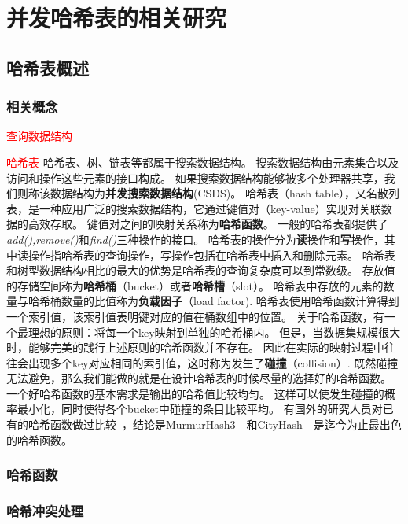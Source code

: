 \chapter{并发哈希表的相关研究}


\section{哈希表概述}

\subsection{相关概念}

\textcolor{red}{查询数据结构}

\textcolor{red}{哈希表}
哈希表、树、链表等都属于搜索数据结构。
搜索数据结构由元素集合以及访问和操作这些元素的接口构成。
如果搜索数据结构能够被多个处理器共享，我们则称该数据结构为\textbf{并发搜索数据结构}(CSDS)。
哈希表（hash table），又名散列表，是一种应用广泛的搜索数据结构，它通过键值对（key-value）实现对关联数据的高效存取。
键值对之间的映射关系称为\textbf{哈希函数}。
一般的哈希表都提供了\textit{add(),remove()}和\textit{find()}三种操作的接口。
哈希表的操作分为\textbf{读}操作和\textbf{写}操作，其中读操作指哈希表的查询操作，写操作包括在哈希表中插入和删除元素。
哈希表和树型数据结构相比的最大的优势是哈希表的查询复杂度可以到常数级。
存放值的存储空间称为\textbf{哈希桶}（bucket）或者\textbf{哈希槽}（slot）。
哈希表中存放的元素的数量与哈希桶数量的比值称为\textbf{负载因子}（load factor).
哈希表使用哈希函数计算得到一个索引值，该索引值表明键对应的值在桶数组中的位置。
关于哈希函数，有一个最理想的原则：将每一个key映射到单独的哈希桶内。
但是，当数据集规模很大时，能够完美的践行上述原则的哈希函数并不存在。
因此在实际的映射过程中往往会出现多个key对应相同的索引值，这时称为发生了\textbf{碰撞}（collision）.
既然碰撞无法避免，那么我们能做的就是在设计哈希表的时候尽量的选择好的哈希函数。
一个好哈希函数的基本需求是输出的哈希值比较均匀。
这样可以使发生碰撞的概率最小化，同时使得各个bucket中碰撞的条目比较平均。
有国外的研究人员对已有的哈希函数做过比较~\cite{Josh2012}，结论是MurmurHash3~\cite{Murmurhash}~和CityHash~\cite{cityhash}~是迄今为止最出色的哈希函数。

\subsection{哈希函数}

\subsection{哈希冲突处理}

